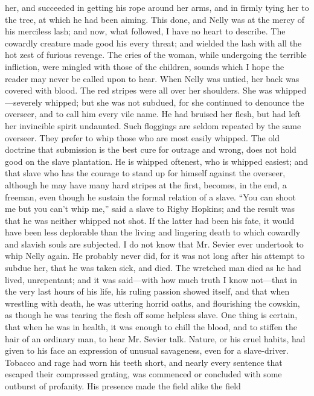 her, and succeeded in getting his rope around her arms, and in firmly
tying her to the tree, at which he had been aiming. This done, and Nelly
was at the mercy of his merciless lash; and now, what followed, I have
no heart to describe. The cowardly creature made good his every threat;
and wielded the lash with all the hot zest of furious revenge. The cries
of the woman, while undergoing the terrible infliction, were mingled
with those of the children, sounds which I hope the reader
{\protect\hypertarget{95}{}{}}may never be called upon to hear. When
Nelly was untied, her back was covered with blood. The red stripes were
all over her shoulders. She was whipped---severely whipped; but she was
not subdued, for she continued to denounce the overseer, and to call him
every vile name. He had bruised her flesh, but had left her invincible
spirit undaunted. Such floggings are seldom repeated by the same
overseer. They prefer to whip those who are most easily whipped. The old
doctrine that submission is the best cure for outrage and wrong, does
not hold good on the slave plantation. He is whipped oftenest, who is
whipped easiest; and that slave who has the courage to stand up for
himself against the overseer, although he may have many hard stripes at
the first, becomes, in the end, a freeman, even though he sustain the
formal relation of a slave. ``You can shoot me but you can't whip me,''
said a slave to Rigby Hopkins; and the result was that he was neither
whipped not shot. If the latter had been his fate, it would have been
less deplorable than the living and lingering death to which cowardly
and slavish souls are subjected. I do not know that Mr. Sevier ever
undertook to whip Nelly again. He probably never did, for it was not
long after his attempt to subdue her, that he was taken sick, and died.
The wretched man died as he had lived, unrepentant; and it was
said---with how much truth I know not---that in the very last hours of
his life, his ruling passion showed itself, and that when wrestling with
death, he was uttering horrid oaths, and flourishing the cowskin, as
though he was tearing the flesh off some helpless slave. One thing is
{\protect\hypertarget{96}{}{}}certain, that when he was in health, it
was enough to chill the blood, and to stiffen the hair of an ordinary
man, to hear Mr. Sevier talk. Nature, or his cruel habits, had given to
his face an expression of unusual savageness, even for a slave-driver.
Tobacco and rage had worn his teeth short, and nearly every sentence
that escaped their compressed grating, was commenced or concluded with
some outburst of profanity. His presence made the field alike the field
